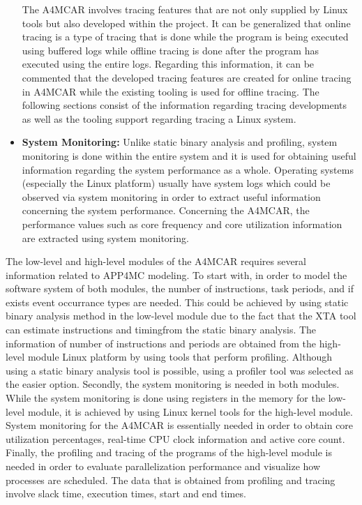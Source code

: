 \begin{itemize}
	The A4MCAR involves tracing features that are not only supplied by Linux tools but also developed within the project. It can be generalized that online tracing is a type of tracing that is done while the program is being executed using buffered logs while offline tracing is done after the program has executed using the entire logs. Regarding this information, it can be commented that the developed tracing features are created for online tracing in A4MCAR while the existing tooling is used for offline tracing. The following sections consist of the information regarding tracing developments as well as the tooling support regarding tracing a Linux system.
	\item \textbf{System Monitoring:} Unlike static binary analysis and profiling, system monitoring \cite{systemmonitoring} is done within the entire system and it is used for obtaining useful information regarding the system performance as a whole. Operating systems (especially the Linux platform) usually have system logs which could be observed via system monitoring in order to extract useful information concerning the system performance. Concerning the A4MCAR, the performance values such as core frequency and core utilization information are extracted using system monitoring.
\end{itemize}

The low-level and high-level modules of the A4MCAR requires several information related to APP4MC modeling. To start with, in order to model the software system of both modules, the number of instructions, task periods, and if exists event occurrance types are needed. This could be achieved by using static binary analysis method in the low-level module due to the fact that the XTA tool can estimate instructions and timingfrom the static binary analysis. The information of number of instructions and periods are obtained from the high-level module Linux platform by using tools that perform profiling. Although using a static binary analysis tool is possible, using a profiler tool was selected as the easier option. Secondly, the system monitoring is needed in both modules. While the system monitoring is done using registers in the memory for the low-level module, it is achieved by using Linux kernel tools for the high-level module. System monitoring for the A4MCAR is essentially needed in order to obtain core utilization percentages, real-time CPU clock information and active core count. Finally, the profiling and tracing of the programs of the high-level module is needed in order to evaluate parallelization performance and visualize how processes are scheduled. The data that is obtained from profiling and tracing involve slack time, execution times, start and end times.

